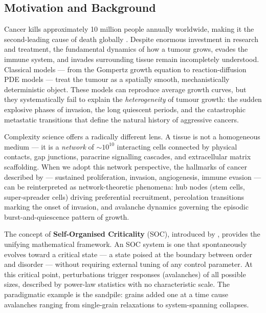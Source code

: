 \documentclass[12pt,a4paper]{article}
\begin{document}
\subsection{Motivation and Background}

Cancer kills approximately 10 million people annually worldwide, making it the
second-leading cause of death globally \citep{sung2021global}.  Despite
enormous investment in research and treatment, the fundamental dynamics of how
a tumour grows, evades the immune system, and invades surrounding tissue remain
incompletely understood.  Classical models --- from the Gompertz growth equation
to reaction-diffusion PDE models --- treat the tumour as a spatially smooth,
mechanistically deterministic object.  These models can reproduce average
growth curves, but they systematically fail to explain the \emph{heterogeneity}
of tumour growth: the sudden explosive phases of invasion, the long quiescent
periods, and the catastrophic metastatic transitions that define the natural
history of aggressive cancers.

Complexity science offers a radically different lens.  A tissue is not a
homogeneous medium --- it is a \emph{network} of $\sim 10^{10}$ interacting
cells connected by physical contacts, gap junctions, paracrine signalling
cascades, and extracellular matrix scaffolding.  When we adopt this network
perspective, the hallmarks of cancer described by \citet{hanahan2011hallmarks}
--- sustained proliferation, invasion, angiogenesis, immune evasion ---
can be reinterpreted as network-theoretic phenomena: hub nodes (stem cells,
super-spreader cells) driving preferential recruitment, percolation transitions
marking the onset of invasion, and avalanche dynamics governing the episodic
burst-and-quiescence pattern of growth.

The concept of \textbf{Self-Organised Criticality} (SOC), introduced by
\citet{bak1987self}, provides the unifying mathematical framework.  An SOC
system is one that spontaneously evolves toward a critical state --- a state
poised at the boundary between order and disorder --- without requiring external
tuning of any control parameter.  At this critical point, perturbations trigger
responses (avalanches) of all possible sizes, described by power-law statistics
with no characteristic scale.  The paradigmatic example is the sandpile: grains
added one at a time cause avalanches ranging from single-grain relaxations to
system-spanning collapses.
\end{document}
